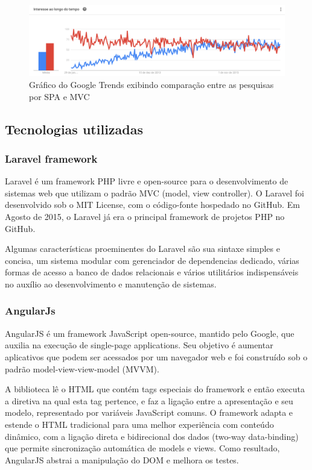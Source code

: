 \begin{figure}
	\label{fig:spa}
	\includegraphics[width=1\textwidth]{img/spa-mvc}
	\caption{Gráfico do Google Trends exibindo comparação entre as pesquisas por SPA e MVC}
\end{figure}


\subsection{Tecnologias utilizadas}


\subsubsection{Laravel framework}


Laravel é um framework PHP livre e open-source para o desenvolvimento de sistemas web que utilizam o padrão MVC (model, view controller). O Laravel foi desenvolvido sob o MIT License, com o código-fonte hospedado no GitHub. Em Agosto de 2015, o Laravel já era o principal framework de projetos PHP no GitHub. 


Algumas características proeminentes do Laravel são sua sintaxe simples e concisa, um sistema modular com gerenciador de dependencias dedicado, várias formas de acesso a banco de dados relacionais e vários utilitários indispensáveis no auxílio ao desenvolvimento e manutenção de sistemas.   


\subsubsection{AngularJs}


AngularJS é um framework JavaScript open-source, mantido pelo Google, que auxilia na execução de single-page applications. Seu objetivo é aumentar aplicativos que podem ser acessados por um navegador web e foi construído sob o padrão model-view-view-model (MVVM).


A biblioteca lê o HTML que contém tags especiais do framework e então executa a diretiva na qual esta tag pertence, e faz a ligação entre a apresentação e seu modelo, representado por variáveis JavaScript comuns. O framework adapta e estende o HTML tradicional para uma melhor experiência com conteúdo dinâmico, com a ligação direta e bidirecional dos dados (two-way data-binding) que permite sincronização automática de models e views. Como resultado, AngularJS abstrai a manipulação do DOM e melhora os testes.



